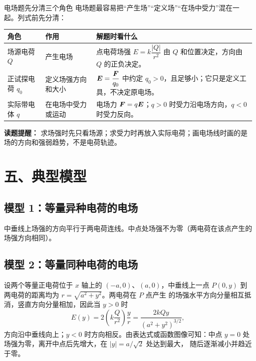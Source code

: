 \begin{learningbox}{电场题先分清三个角色}
电场题最容易把“产生场”“定义场”“在场中受力”混在一起。列式前先分清：
\begin{center}
\begin{tabular}{p{}p{}p{}}
\toprule
角色 & 作用 & 解题时看什么 \\
\midrule
场源电荷 $Q$ & 产生电场 & 点电荷场强 $E=k\dfrac{|Q|}{r^2}$ 由 $Q$ 和位置决定，方向由 $Q$ 的正负决定。 \\
正试探电荷 $q_0$ & 定义场强方向和大小 & $\boldsymbol{E}=\dfrac{\boldsymbol{F}}{q_0}$ 中约定 $q_0>0$，且足够小；它只是定义工具，不决定原电场。 \\
实际带电体 $q$ & 在电场中受力或运动 & 电场力 $\boldsymbol{F}=q\boldsymbol{E}$；$q>0$ 时受力沿电场方向，$q<0$ 时受力反向。 \\
\bottomrule
\end{tabular}
\end{center}
\textbf{读题提醒：} 求场强时先只看场源；求受力时再放入实际电荷；画电场线时画的是场的方向和强弱趋势，不是电荷轨迹。
\end{learningbox}

\section*{五、典型模型}

\subsection*{模型 1：等量异种电荷的电场}

中垂线上场强的方向平行于两电荷连线。中点处场强不为零（两电荷在该点产生的场强方向相同）。

\begin{center}


\label{fig:dipole-field-lines}
\end{center}

\subsection*{模型 2：等量同种电荷的电场}

设两个等量正电荷位于 $x$ 轴上的 $(-a,0)$、$(a,0)$，中垂线上一点
$P(0,y)$ 到两电荷的距离均为 $r=\sqrt{a^2+y^2}$。两电荷在 $P$ 点产生
的场强水平方向分量相互抵消，竖直方向分量相加，因此当 $y>0$ 时
\[
E(y)=2\left(k\frac{Q}{r^2}\right)\frac{y}{r}
=\frac{2kQy}{(a^2+y^2)^{3/2}},
\]
方向沿中垂线向上；$y<0$ 时方向相反。由表达式或函数图像可知：中点
$y=0$ 处场强为零，离开中点后先增大，在 $|y|=a/\sqrt2$ 处达到最大，
随后逐渐减小并趋近于零。


